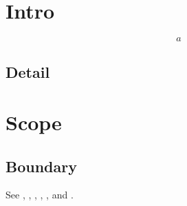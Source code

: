 \section{Intro}\label{sec:intro}
\begin{equation}\label{eq:first}a\end{equation}
\subsection{Detail}\label{sub:detail}
\section{Scope}\label{sec:scope}
\subsection{Boundary}\label{sub:boundary}
See , , , , , and .
